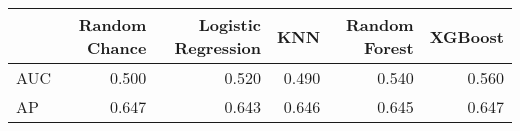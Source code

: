 \begin{tabular}{lrrrrr}
\toprule
{} &  Random Chance &  Logistic Regression &    KNN &  Random Forest &  XGBoost \\
\midrule
AUC &          0.500 &                0.520 &  0.490 &          0.540 &    0.560 \\
AP  &          0.647 &                0.643 &  0.646 &          0.645 &    0.647 \\
\bottomrule
\end{tabular}
